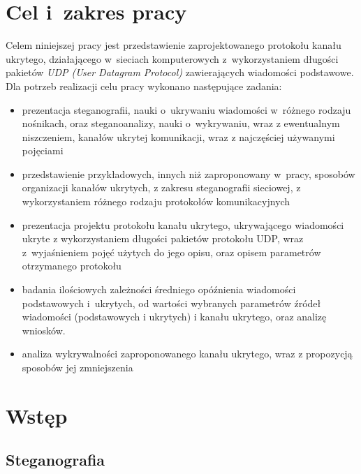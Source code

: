 \documentclass[a4paper, twoside, 12pt]{report}
\begin{document}
\tableofcontents

\listoffigures

\chapter{Cel i~zakres pracy}
    Celem niniejszej pracy jest przedstawienie zaprojektowanego protokołu kanału
    ukrytego, działającego w~sieciach komputerowych z~wykorzystaniem długości pakietów
    \emph{UDP (User Datagram Protocol)} zawierających wiadomości podstawowe.
    Dla potrzeb realizacji celu pracy wykonano następujące zadania:
    \begin{itemize}
        \item prezentacja steganografii, nauki o~ukrywaniu wiadomości w~różnego rodzaju nośnikach,
            oraz steganoanalizy, nauki o~wykrywaniu, wraz z ewentualnym niszczeniem, kanałów
            ukrytej komunikacji, wraz z najczęściej używanymi pojęciami
        \item przedstawienie przykładowych, innych niż zaproponowany w~pracy,
            sposobów organizacji kanałów ukrytych, z zakresu steganografii sieciowej,
            z wykorzystaniem różnego rodzaju protokołów komunikacyjnych
        \item prezentacja projektu protokołu kanału ukrytego, ukrywającego
            wiadomości ukryte z wykorzystaniem długości pakietów protokołu UDP, wraz
            z~wyjaśnieniem pojęć użytych do jego opisu, oraz opisem parametrów otrzymanego protokołu
        \item badania ilościowych zależności średniego opóźnienia
            wiadomości podstawowych i~ukrytych, od wartości wybranych parametrów
            źródeł wiadomości (podstawowych i ukrytych) i kanału ukrytego, oraz analizę wniosków.
        \item analiza wykrywalności zaproponowanego kanału ukrytego,
            wraz z propozycją sposobów jej zmniejszenia
    \end{itemize}

\chapter{Wstęp}
    \section{Steganografia}
\end{document}
